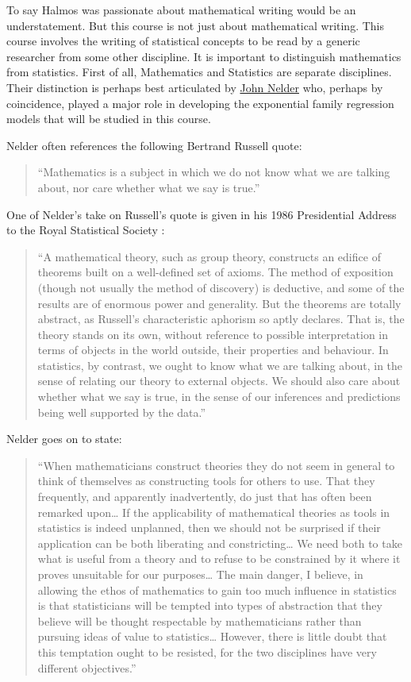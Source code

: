 \documentclass[
]{article}
\begin{document}
To say Halmos was passionate about mathematical writing would be an
understatement. But this course is not just about mathematical writing.
This course involves the writing of statistical concepts to be read by a
generic researcher from some other discipline. It is important to
distinguish mathematics from statistics. First of all, Mathematics and
Statistics are separate disciplines. Their distinction is perhaps best
articulated by \href{https://en.wikipedia.org/wiki/John_Nelder}{John
Nelder} who, perhaps by coincidence, played a major role in developing
the exponential family regression models that will be studied in this
course.

Nelder often references the following Bertrand Russell quote:

\begin{quote}
``Mathematics is a subject in which we do not know what we are talking
about, nor care whether what we say is true.''
\end{quote}

One of Nelder's take on Russell's quote is given in his 1986
Presidential Address to the Royal Statistical Society
\citep{nelder1986statistics}:

\begin{quote}
``A mathematical theory, such as group theory, constructs an edifice of
theorems built on a well-defined set of axioms. The method of exposition
(though not usually the method of discovery) is deductive, and some of
the results are of enormous power and generality. But the theorems are
totally abstract, as Russell's characteristic aphorism so aptly
declares. That is, the theory stands on its own, without reference to
possible interpretation in terms of objects in the world outside, their
properties and behaviour. In statistics, by contrast, we ought to know
what we are talking about, in the sense of relating our theory to
external objects. We should also care about whether what we say is true,
in the sense of our inferences and predictions being well supported by
the data.''
\end{quote}

Nelder goes on to state:

\begin{quote}
``When mathematicians construct theories they do not seem in general to
think of themselves as constructing tools for others to use. That they
frequently, and apparently inadvertently, do just that has often been
remarked upon\ldots{} If the applicability of mathematical theories as
tools in statistics is indeed unplanned, then we should not be surprised
if their application can be both liberating and constricting\ldots{} We
need both to take what is useful from a theory and to refuse to be
constrained by it where it proves unsuitable for our purposes\ldots{}
The main danger, I believe, in allowing the ethos of mathematics to gain
too much influence in statistics is that statisticians will be tempted
into types of abstraction that they believe will be thought respectable
by mathematicians rather than pursuing ideas of value to
statistics\ldots{} However, there is little doubt that this temptation
ought to be resisted, for the two disciplines have very different
objectives.''
\end{quote}
\end{document}
